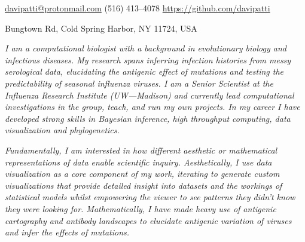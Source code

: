 \documentclass[10pt,a4paper]{article}
\begin{document}
\sloppy  %


\nobreakvspace{0.3em}  %

\noindent\href{mailto:davipatti@protonmail.com}{davipatti\mbox{}@\mbox{}protonmail.com}\sbull
{} (516) 413--4078\sbull
\href{https://github.com/davipatti}{https://github.com/davipatti}
\par {} Bungtown Rd, Cold Spring Harbor, NY 11724, USA

\spacedhrule{0.5em}{-0.4em}  %

 \begin{multicols}{2} 
    
  \emph{ I am a computational biologist with a background in evolutionary biology and
  infectious diseases. My research spans inferring infection histories from messy
  serological data, elucidating the antigenic effect of mutations and testing the
  predictability of seasonal influenza viruses. I am a Senior Scientist at the Influenza
  Research Institute (UW---Madison) and currently lead computational investigations in
  the group, teach, and run my own projects. In my career I have developed strong skills
  in Bayesian inference, high throughput computing, data visualization and phylogenetics.
  }
  
  \emph{ Fundamentally, I am interested in how different aesthetic or mathematical
  representations of data enable scientific inquiry. Aesthetically, I use data
  visualization as a core component of my work, iterating to generate custom
  visualizations that provide detailed insight into datasets and the workings of
  statistical models whilst empowering the viewer to see patterns they didn't know they
  were looking for. Mathematically, I have made heavy use of antigenic cartography and
  antibody landscapes to elucidate antigenic variation of viruses and infer the effects
  of mutations. }
\end{multicols}

\spacedhrule{0.9em}{-0.4em}

\end{document}
